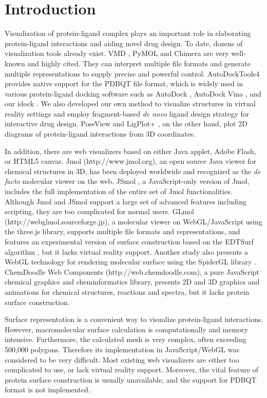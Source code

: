 \documentclass{bioinfo}
\begin{document}
\section{Introduction}

Visualization of protein-ligand complex plays an important role in elaborating protein-ligand interactions and aiding novel drug design. To date, dozens of visualization tools already exist. VMD \citep{1220}, PyMOL \citep{1221} and Chimera \citep{1219} are very well-known and highly cited. They can interpret multiple file formats and generate multiple representations to supply precise and powerful control. AutoDockTools4 \citep{596} provides native support for the PDBQT file format, which is widely used in various protein-ligand docking software such as AutoDock \citep{596}, AutoDock Vina \citep{595}, and our idock \citep{1153}. We also developed our own method \citep{1265} to visualize structures in virtual reality settings and employ fragment-based \textit{de novo} ligand design strategy for interactive drug design. PoseView \citep{748} and LigPlot+ \citep{951}, on the other hand, plot 2D diagrams of protein-ligand interactions from 3D coordinates.

In addition, there are web visualizers based on either Java applet, Adobe Flash, or HTML5 canvas. Jmol (http://www.jmol.org), an open source Java viewer for chemical structures in 3D, has been deployed worldwide and recognized as the \textit{de facto} molecular viewer on the web. JSmol \citep{1314}, a JavaScript-only version of Jmol, includes the full implementation of the entire set of Jmol functionalities. Although Jmol and JSmol support a large set of advanced features including scripting, they are too complicated for normal users. GLmol (http://webglmol.sourceforge.jp), a molecular viewer on WebGL/JavaScript using the three.js library, supports multiple file formats and representations, and features an experimental version of surface construction based on the EDTSurf algorithm \citep{1297,1350}, but it lacks virtual reality support. Another study \citep{1262} also presents a WebGL technology for rendering molecular surface using the SpiderGL library \citep{1320}. ChemDoodle Web Components (http://web.chemdoodle.com), a pure JavaScript chemical graphics and cheminformatics library, presents 2D and 3D graphics and animations for chemical structures, reactions and spectra, but it lacks protein surface construction.

Surface representation is a convenient way to visualize protein-ligand interactions. However, macromolecular surface calculation is computationally and memory intensive. Furthermore, the calculated mesh is very complex, often exceeding 500,000 polygons. Therefore its implementation in JavaScript/WebGL was considered to be very difficult. Most existing web visualizers are either too complicated to use, or lack virtual reality support. Moreover, the vital feature of protein surface construction is usually unavailable, and the support for PDBQT format is not implemented.
\end{document}
